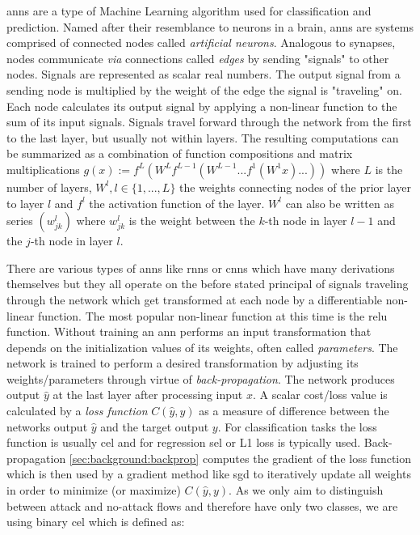 \glspl{ann} are a type of Machine Learning algorithm used for classification and prediction. Named after their resemblance to neurons in a brain, \glspl{ann} are systems comprised of connected nodes called \textit{artificial neurons}. Analogous to synapses, nodes communicate \textit{via} connections called \textit{edges} by sending "signals" to other nodes. Signals are represented as scalar real numbers. The output signal from a sending node is multiplied by the weight of the edge the signal is "traveling" on. Each node calculates its output signal by applying a non-linear function to the sum of its input signals. Signals travel forward through the network from the first to the last layer, but usually not within layers. The resulting computations can be summarized as a combination of function compositions and matrix multiplications $g(x) := f^L(W^Lf^{L-1}(W^{L-1}...f^1(W^1x)...))$ where $L$ is the number of layers, $W^l, l \in \{1,...,L\}$ the weights connecting nodes of the prior layer to layer $l$ and $f^l$ the activation function of the layer. $W^l$ can also be written as series $(w^l_{jk})$ where $w^l_{jk}$ is the weight between the $k$-th node in layer $l-1$ and the $j$-th node in layer $l$. \par There are various types of \glspl{ann} like \glspl{rnn} or \glspl{cnn} which have many derivations themselves but they all operate on the before stated principal of signals traveling through the network which get transformed at each node by a differentiable non-linear function. The most popular non-linear function at this time is the \gls{relu} function. Without training an \gls{ann} performs an input transformation that depends on the initialization values of its weights, often called \textit{parameters}. The network is trained to perform a desired transformation by adjusting its weights/parameters through virtue of \textit{back-propagation}. The network produces output $\hat{y}$ at the last layer after processing input $x$. A scalar cost/loss value is calculated by a \textit{loss function} $C(\hat{y}, y)$ as a measure of difference between the networks output $\hat{y}$ and the target output $y$. For classification tasks the loss function is usually \gls{cel} and for regression \gls{sel} or L1 loss is typically used. Back-propagation \ref{sec:background:backprop} computes the gradient of the loss function which is then used by a gradient method like \gls{sgd} to iteratively update all weights in order to minimize (or maximize) $C(\hat{y}, y)$. As we only aim to distinguish between attack and no-attack flows and therefore have only two classes, we are using binary \gls{cel} which is defined as:


